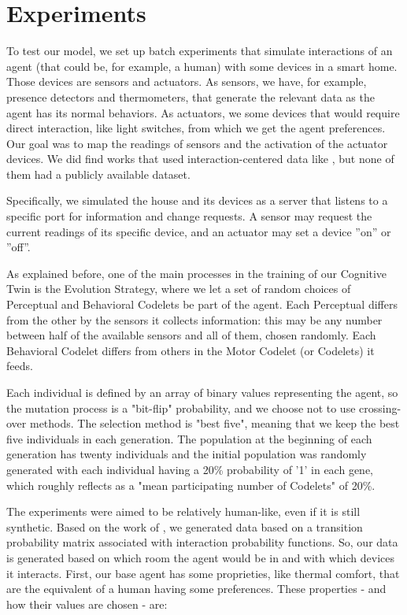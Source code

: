 \section{Experiments}
\label{sec:sec4}

To test our model, we set up batch experiments that simulate interactions of an agent (that could be, for example, a human) with some devices in a smart home. Those devices are sensors and actuators. As sensors, we have, for example, presence detectors and thermometers, that generate the relevant data as the agent has its normal behaviors. As actuators, we some devices that would require direct interaction, like light switches, from which we get the agent preferences. Our goal was to map the readings of sensors and the activation of the actuator devices. We did find works that used interaction-centered data like \cite{engelmann2016interaction}, but none of them had a publicly available dataset.

Specifically, we simulated the house and its devices as a server that listens to a specific port for information and change requests. A sensor may request the current readings of its specific device, and an actuator may set a device ''on'' or ''off''. 



As explained before, one of the main processes in the training of our Cognitive Twin is the Evolution Strategy, where we let a set of random choices of Perceptual and Behavioral Codelets be part of the agent. Each Perceptual differs from the other by the sensors it collects information: this may be any number between half of the available sensors and all of them, chosen randomly. Each Behavioral Codelet differs from others in the Motor Codelet (or Codelets) it feeds. 

Each individual is defined by an array of binary values representing the agent, so the mutation process is a "bit-flip" probability, and we choose not to use crossing-over methods. The selection method is "best five", meaning that we keep the best five individuals in each generation. The population at the beginning of each generation has twenty individuals and the initial population was randomly generated with each individual having a 20\% probability of '1' in each gene, which roughly reflects as a "mean participating number of Codelets" of 20\%.



The experiments were aimed to be relatively human-like, even if it is still synthetic. Based on the work of \cite{mendez2009simulating}, we generated data based on a transition probability matrix associated with interaction probability functions. So, our data is generated based on which room the agent would be in and with which devices it interacts. First, our base agent has some proprieties, like thermal comfort, that are the equivalent of a human having some preferences. These properties - and how their values are chosen - are:

